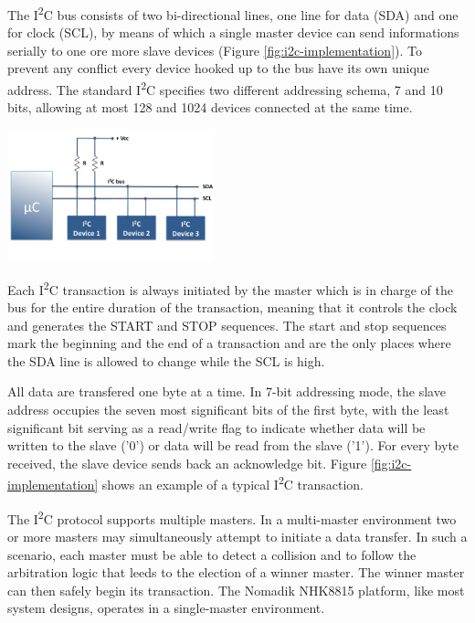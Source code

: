 \documentclass[a4paper,10pt]{article}
\makeatletter
\newenvironment{figurehere}{\def\@captype{figure}\vspace{2ex}}{\vspace{2ex}}
\newcommand{\icc}{I\textsuperscript{2}C }
\makeatother
\begin{document}
\begin{multicols}{2}
The \icc bus consists of two bi-directional lines, one line for data (SDA)
and one for clock (SCL), by means of which a single master device can send
informations serially to one ore more slave devices (Figure
\ref{fig:i2c-implementation}).
To prevent any conflict every device hooked up to the bus have its own unique
address. The standard \icc specifies two different addressing schema, 7 and
10 bits, allowing at most 128 and 1024 devices connected at the same time.

\begin{figurehere}
 \centering
 \includegraphics[width=6cm]{./figures/i2c-diagram.png}
 \caption{Sample \icc implementation (adapted from \emph{embedded-lab.com}).}
 \label{fig:i2c-implementation}
\end{figurehere}

Each \icc transaction is always initiated by the master which is in charge of
the bus for the entire duration of the transaction, meaning that it controls the
clock and generates the START and STOP sequences. The start and stop sequences
mark the beginning and the end of a transaction and are the only places where
the SDA line is allowed to change while the SCL is high.

All data are transfered one byte at a time. In 7-bit addressing mode, the slave
address occupies the seven most significant bits of the first byte, with the
least significant bit serving as a read/write flag to indicate whether data
will be written to the slave ('0') or data will be read from the slave ('1').
For every byte received, the slave device sends back an acknowledge bit.
Figure \ref{fig:i2c-implementation} shows an example of a typical \icc
transaction.

The \icc protocol supports multiple masters. In a multi-master environment two
or more masters may simultaneously attempt to initiate a data transfer.
In such a scenario, each master must be able to detect a collision and to follow
the arbitration logic that leeds to the election of a winner master. The winner
master can then safely begin its transaction.
The Nomadik NHK8815 platform, like most system designs, operates in a 
single-master environment.


\end{multicols}
\end{document}
